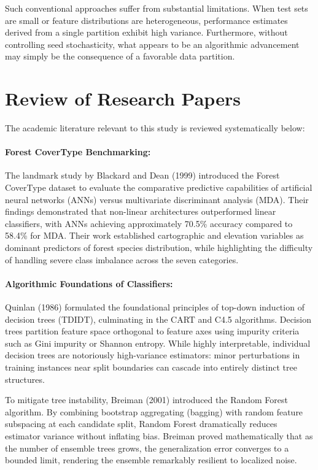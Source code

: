 Such conventional approaches suffer from substantial limitations. When test sets are small or feature distributions are heterogeneous, performance estimates derived from a single partition exhibit high variance. Furthermore, without controlling seed stochasticity, what appears to be an algorithmic advancement may simply be the consequence of a favorable data partition.

\section{Review of Research Papers}
\label{sec:review_papers}

The academic literature relevant to this study is reviewed systematically below:

\paragraph{Forest CoverType Benchmarking:}
The landmark study by Blackard and Dean (1999) \cite{blackard1999comparative} introduced the Forest CoverType dataset to evaluate the comparative predictive capabilities of artificial neural networks (ANNs) versus multivariate discriminant analysis (MDA). Their findings demonstrated that non-linear architectures outperformed linear classifiers, with ANNs achieving approximately 70.5\% accuracy compared to 58.4\% for MDA. Their work established cartographic and elevation variables as dominant predictors of forest species distribution, while highlighting the difficulty of handling severe class imbalance across the seven categories.

\paragraph{Algorithmic Foundations of Classifiers:}
Quinlan (1986) \cite{quinlan1986induction} formulated the foundational principles of top-down induction of decision trees (TDIDT), culminating in the CART and C4.5 algorithms. Decision trees partition feature space orthogonal to feature axes using impurity criteria such as Gini impurity or Shannon entropy. While highly interpretable, individual decision trees are notoriously high-variance estimators: minor perturbations in training instances near split boundaries can cascade into entirely distinct tree structures.

To mitigate tree instability, Breiman (2001) \cite{breiman2001random} introduced the Random Forest algorithm. By combining bootstrap aggregating (bagging) with random feature subspacing at each candidate split, Random Forest dramatically reduces estimator variance without inflating bias. Breiman proved mathematically that as the number of ensemble trees grows, the generalization error converges to a bounded limit, rendering the ensemble remarkably resilient to localized noise.

